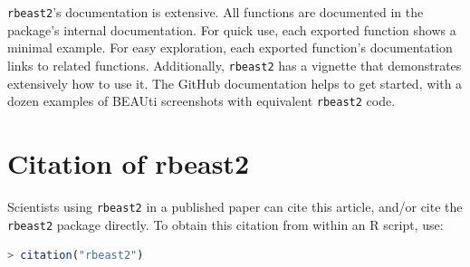 \documentclass{article}
\begin{document}
\verb;rbeast2;'s documentation is extensive. All functions are documented
in the package's internal documentation. For quick use, 
each exported function shows a minimal example. 
For easy exploration, each exported function's documentation links to related functions.
Additionally, \verb;rbeast2; has a vignette that demonstrates extensively how
to use it. The GitHub documentation helps to get started, with a dozen examples 
of BEAUti screenshots with equivalent \verb;rbeast2; code.

\section{Citation of rbeast2}

Scientists using \verb;rbeast2; in a published paper can cite this
article, and/or cite the \verb;rbeast2; package 
directly. To obtain this citation from within an R script, use:

\begin{lstlisting}[language=R]
> citation("rbeast2")
\end{lstlisting}



\end{document}
